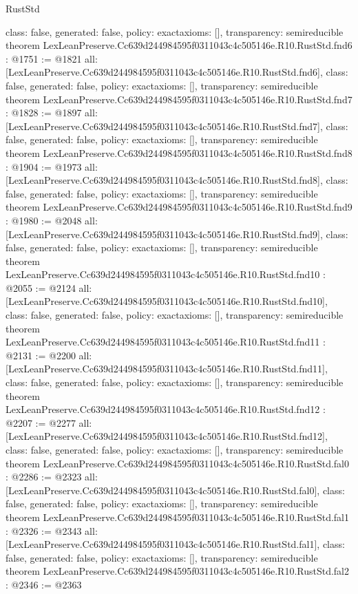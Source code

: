 \begin{lexlean}{RustStd}
\begin{coremodule}
{  class: false,
  generated: false,
  policy: exact{axioms: []},
  transparency: semireducible
}
theorem LexLeanPreserve.Cc639d244984595f0311043c4c505146e.R10.RustStd.fnd6 : @1751 := @1821 {
  all: [LexLeanPreserve.Cc639d244984595f0311043c4c505146e.R10.RustStd.fnd6],
  class: false,
  generated: false,
  policy: exact{axioms: []},
  transparency: semireducible
}
theorem LexLeanPreserve.Cc639d244984595f0311043c4c505146e.R10.RustStd.fnd7 : @1828 := @1897 {
  all: [LexLeanPreserve.Cc639d244984595f0311043c4c505146e.R10.RustStd.fnd7],
  class: false,
  generated: false,
  policy: exact{axioms: []},
  transparency: semireducible
}
theorem LexLeanPreserve.Cc639d244984595f0311043c4c505146e.R10.RustStd.fnd8 : @1904 := @1973 {
  all: [LexLeanPreserve.Cc639d244984595f0311043c4c505146e.R10.RustStd.fnd8],
  class: false,
  generated: false,
  policy: exact{axioms: []},
  transparency: semireducible
}
theorem LexLeanPreserve.Cc639d244984595f0311043c4c505146e.R10.RustStd.fnd9 : @1980 := @2048 {
  all: [LexLeanPreserve.Cc639d244984595f0311043c4c505146e.R10.RustStd.fnd9],
  class: false,
  generated: false,
  policy: exact{axioms: []},
  transparency: semireducible
}
theorem LexLeanPreserve.Cc639d244984595f0311043c4c505146e.R10.RustStd.fnd10 : @2055 := @2124 {
  all: [LexLeanPreserve.Cc639d244984595f0311043c4c505146e.R10.RustStd.fnd10],
  class: false,
  generated: false,
  policy: exact{axioms: []},
  transparency: semireducible
}
theorem LexLeanPreserve.Cc639d244984595f0311043c4c505146e.R10.RustStd.fnd11 : @2131 := @2200 {
  all: [LexLeanPreserve.Cc639d244984595f0311043c4c505146e.R10.RustStd.fnd11],
  class: false,
  generated: false,
  policy: exact{axioms: []},
  transparency: semireducible
}
theorem LexLeanPreserve.Cc639d244984595f0311043c4c505146e.R10.RustStd.fnd12 : @2207 := @2277 {
  all: [LexLeanPreserve.Cc639d244984595f0311043c4c505146e.R10.RustStd.fnd12],
  class: false,
  generated: false,
  policy: exact{axioms: []},
  transparency: semireducible
}
theorem LexLeanPreserve.Cc639d244984595f0311043c4c505146e.R10.RustStd.fal0 : @2286 := @2323 {
  all: [LexLeanPreserve.Cc639d244984595f0311043c4c505146e.R10.RustStd.fal0],
  class: false,
  generated: false,
  policy: exact{axioms: []},
  transparency: semireducible
}
theorem LexLeanPreserve.Cc639d244984595f0311043c4c505146e.R10.RustStd.fal1 : @2326 := @2343 {
  all: [LexLeanPreserve.Cc639d244984595f0311043c4c505146e.R10.RustStd.fal1],
  class: false,
  generated: false,
  policy: exact{axioms: []},
  transparency: semireducible
}
theorem LexLeanPreserve.Cc639d244984595f0311043c4c505146e.R10.RustStd.fal2 : @2346 := @2363 {
}
\end{coremodule}
\end{lexlean}
